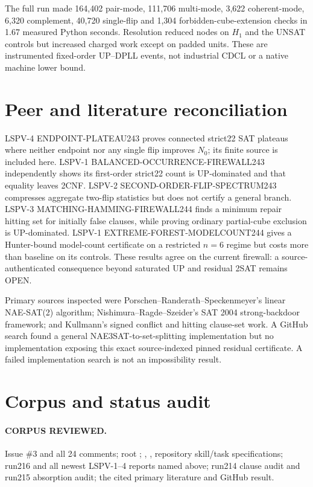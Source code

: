 \documentclass[11pt]{article}
\begin{document}
The full run made 164,402 pair-mode, 111,706 multi-mode, 3,622 coherent-mode,
6,320 complement, 40,720 single-flip and 1,304 forbidden-cube-extension checks
in 1.67 measured Python seconds.  Resolution reduced nodes on $H_1$ and the
UNSAT controls but increased charged work except on padded units.  These are
instrumented fixed-order UP--DPLL events, not industrial CDCL or a native
machine lower bound.

\section{Peer and literature reconciliation}

LSPV-4 ENDPOINT-PLATEAU243 proves connected strict22 SAT plateaus where neither
endpoint nor any single flip improves $N_0$; its finite source is included
here.  LSPV-1 BALANCED-OCCURRENCE-FIREWALL243 independently shows its
first-order strict22 count is UP-dominated and that equality leaves 2CNF.
LSPV-2 SECOND-ORDER-FLIP-SPECTRUM243 compresses aggregate two-flip statistics
but does not certify a general branch.  LSPV-3 MATCHING-HAMMING-FIREWALL244
finds a minimum repair hitting set for initially false clauses, while proving
ordinary partial-cube exclusion is UP-dominated.  LSPV-1
EXTREME-FOREST-MODELCOUNT244 gives a Hunter-bound model-count certificate on a
restricted $n=6$ regime but costs more than baseline on its controls.  These
results agree on the current firewall: a source-authenticated consequence
beyond saturated UP and residual 2SAT remains OPEN.

Primary sources inspected were Porschen--Randerath--Speckenmeyer's linear
NAE-SAT(2) algorithm; Nishimura--Ragde--Szeider's SAT 2004 strong-backdoor
framework; and Kullmann's signed conflict and hitting clause-set work.  A
GitHub search found a general NAE3SAT-to-set-splitting implementation but no
implementation exposing this exact source-indexed pinned residual certificate.
A failed implementation search is not an impossibility result.

\section{Corpus and status audit}

\paragraph{CORPUS REVIEWED.}
Issue \#3 and all 24 comments; root ; ,
, repository skill/task specifications; run216 and all newest
LSPV-1--4 reports named above; run214 clause audit and run215 absorption audit;
the cited primary literature and GitHub result.
\end{document}
